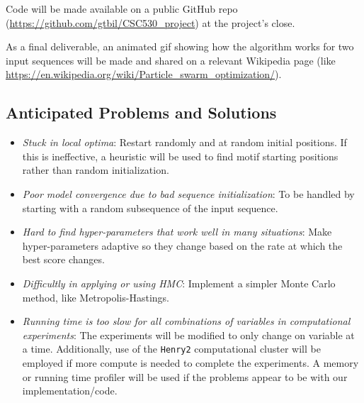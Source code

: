 \documentclass{article}
\begin{document}
  Code will be made available on a public GitHub repo (\url{https://github.com/gtbil/CSC530_project}) at the project's close.  
  
  As a final deliverable, an animated gif showing how the algorithm works for two input sequences will be made and shared on a relevant Wikipedia page (like \url{https://en.wikipedia.org/wiki/Particle_swarm_optimization/}).
\subsection{Anticipated Problems and Solutions}
\begin{itemize}
    \item \textit{Stuck in local optima}: Restart randomly and at random initial positions. If this is ineffective, a heuristic will be used to find motif starting positions rather than random initialization.
	\item \textit{Poor model convergence due to bad sequence initialization}: To be handled by starting with a random subsequence of the input sequence.
	\item \textit{Hard to find hyper-parameters that work well in many situations}: Make hyper-parameters adaptive so they change based on the rate at which the best score changes.
	\item \textit{Difficultly in applying or using HMC}: Implement a simpler Monte Carlo method, like Metropolis-Hastings.
	\item \textit{Running time is too slow for all combinations of variables in computational experiments}: The experiments will be modified to only change on variable at a time. Additionally, use of the \texttt{Henry2} computational cluster will be employed if more compute is needed to complete the experiments. A memory or running time profiler will be used if the problems appear to be with our implementation/code.
\end{itemize}
\end{document}
